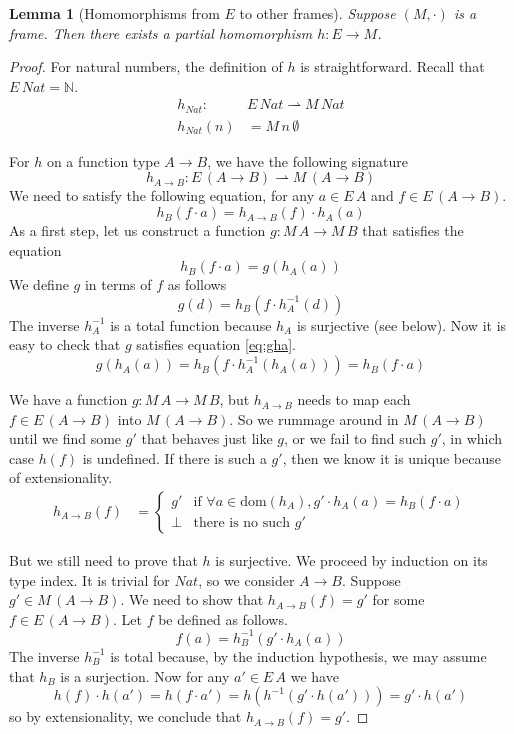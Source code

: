 \documentclass{tufte-handout}
\newcommand{\pto}[0]{\rightharpoonup}
\newcommand{\NATTY}[0]{\mathit{Nat}}
\newtheorem{lemma}[theorem]{Lemma}
\begin{document}
\begin{lemma}[Homomorphisms from $E$ to other frames]
\label{lem:homo-model-frame}
  Suppose $(M,\cdot)$ is a frame. Then there exists a partial
  homomorphism $h : E \to M$.
\end{lemma}
\begin{proof}
  For natural numbers, the definition of $h$ is straightforward.
  Recall that $E\,\NATTY = \mathbb{N}$.
  \begin{align*}
    h_{\NATTY} : \; & E\,\NATTY \pto M\,\NATTY \\
    h_{\NATTY}(n) &= M\,n\,\emptyset 
  \end{align*}

  For $h$ on a function type $A\to B$, we have the following signature
  \[
  h_{A \to B} : E\,(A \to B) \pto M\,(A \to B)
  \]
  We need to satisfy the following equation, for any $a \in E\,A$
  and $f \in E\,(A \to B)$.
  \[
    h_B(f \cdot a) = h_{A \to B}(f) \cdot h_A(a)
  \]
  As a first step, let us construct a function $g : M\,A \to M\,B$
  that satisfies the equation
  \begin{equation}\label{eq:gha}
    h_B(f \cdot a) = g(h_A(a))
  \end{equation}
  We define $g$ in terms of $f$ as follows
  \[
    g(d) = h_B(f \cdot h^{-1}_A(d))
  \]
  The inverse $h^{-1}_A$ is a total function because $h_A$ is
  surjective (see below).  Now it is easy to check that $g$ satisfies
  equation \eqref{eq:gha}.
  \[
  g(h_A(a)) = h_B(f \cdot h^{-1}_A(h_A(a))) = h_B(f \cdot a)
  \]

  We have a function $g : M\,A \to M\,B$, but $h_{A\to B}$ needs to
  map each $f \in E\,(A \to B)$ into $M\,(A \to B)$. So we rummage
  around in $M\,(A \to B)$ until we find some $g'$ that behaves just
  like $g$, or we fail to find such $g'$, in which case $h(f)$ is
  undefined. If there is such a $g'$, then we know it is unique
  because of extensionality.
  \begin{align*}
    h_{A \to B}(f) &= 
    \begin{cases}
      g' & \text{if } \forall a \in \mathrm{dom}(h_A), g' \cdot h_A(a) = h_B(f \cdot a)\\
      \bot & \text{there is no such $g'$}
    \end{cases}
  \end{align*}

  But we still need to prove that $h$ is surjective. We proceed by
  induction on its type index.  It is trivial for $\NATTY$, so we
  consider $A \to B$.  Suppose $g' \in M\,(A \to B)$. We need to show
  that $h_{A\to B}(f) = g'$ for some $f \in E\,(A\to B)$.  Let $f$ be
  defined as follows.
  \[
  f(a) = h^{-1}_B(g' \cdot h_A(a))
  \]
  The inverse $h^{-1}_B$ is total because, by the induction hypothesis,
  we may assume that $h_B$ is a surjection.
  Now for any $a' \in E\,A$ we have
  \[
  h(f) \cdot h(a') = h(f \cdot a')
   = h(h^{-1}(g' \cdot h(a')))
   = g' \cdot h(a')
  \]
  so by extensionality, we conclude that $h_{A\to B}(f) = g'$.

\end{proof}
\end{document}
